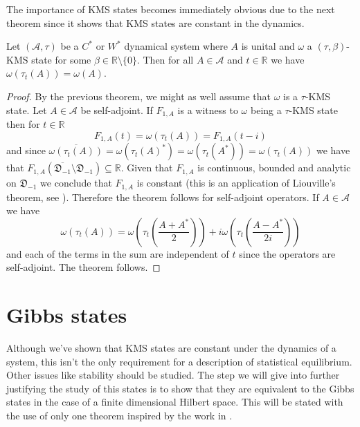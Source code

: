 The importance of KMS states becomes immediately obvious due to the next theorem since it shows that KMS states are constant in the dynamics.

\begin{theorem}
Let $(\mathcal{A},\tau)$ be a $C^*$ or $W^*$ dynamical system where $A$ is unital and $\omega$ a $(\tau,\beta)$-KMS state for some $\beta\in\mathbb{R}\setminus\{0\}$. Then for all $A\in\mathcal{A}$ and $t\in\mathbb{R}$ we have $\omega(\tau_t(A))=\omega(A)$.
\end{theorem}

\begin{proof}
By the previous theorem, we might as well assume that $\omega$ is a $\tau$-KMS state. Let $A\in\mathcal{A}$ be self-adjoint. If $F_{1,A}$ is a witness to $\omega$ being a $\tau$-KMS state then for $t\in\mathbb{R}$
\begin{equation}
F_{1,A}(t)=\omega(\tau_t(A))=F_{1,A}(t-i)
\end{equation}
and since $\overline{\omega(\tau_t(A))}=\omega(\tau_t(A)^*)=\omega(\tau_t(A^*))=\omega(\tau_t(A))$ we have that $F_{1,A}(\overline{\mathfrak{D}_{-1}}\setminus\mathfrak{D}_{-1})\subseteq\mathbb{R}$. Given that $F_{1,A}$ is continuous, bounded and analytic on $\mathfrak{D}_{-1}$ we conclude that $F_{1,A}$ is constant (this is an application of Liouville's theorem, see \cite{Duvenhage1999}). Therefore the theorem follows for self-adjoint operators.
If $A\in\mathcal{A}$ we have
\begin{equation}
\omega(\tau_t(A))=\omega\left(\tau_t\left(\frac{A+A^*}{2}\right)\right)+i\omega\left(\tau_t\left(\frac{A-A^*}{2i}\right)\right)
\end{equation}
and each of the terms in the sum are independent of $t$ since the operators are self-adjoint. The theorem follows.
\end{proof}

\section{Gibbs states}

Although we've shown that KMS states are constant under the dynamics of a system, this isn't the only requirement for a description of statistical equilibrium. Other issues like stability should be studied. The step we will give into further justifying the study of this states is to show that they are equivalent to the Gibbs states in the case of a finite dimensional Hilbert space. This will be stated with the use of only one theorem inspired by the work in \cite{Duvenhage1999}.


